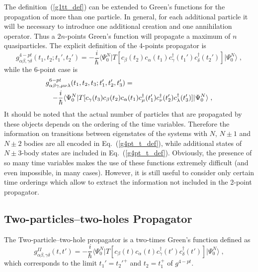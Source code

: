 The definition~(\ref{g1tt_def}) can be extended to Green's functions for the propagation of more than one particle.
In general, for each additional particle it will be necessary to introduce one additional creation and one annihilation operator. Thus a $2n$-points Green's function will propagate a maximum of $n$ quasiparticles.
The explicit definition of the 4-points propagator is
\begin{equation}
g^{4-pt}_{\alpha \beta, \gamma \delta}(t_1, t_2; t_1', t_2') = -\frac{i}{\hbar} 
\langle \Psi^N_0 \vert T [c_\beta(t_2) c_\alpha(t_1) c_\gamma^\dag(t_1')  c_\delta^\dag(t_2') ] \vert \Psi^N_0 \rangle \; ,
\label{g4pt_t_def}
\end{equation}
while the 6-point case is
\begin{eqnarray}
\lefteqn{
g^{6-pt}_{\alpha \beta \gamma, \mu \nu \lambda}(t_1, t_2, t_3; t_1', t_2', t_3') =
} & & 
\nonumber \\
\qquad  & & -\frac{i}{\hbar} 
\langle \Psi^N_0 \vert T [  c_\gamma(t_3) c_\beta(t_2) c_\alpha(t_1)
        c_\mu^\dag(t_1')  c_\nu^\dag(t_2')  c_\lambda^\dag(t_3')] \vert \Psi^N_0 \rangle \; ,
\qquad
\label{g6pt_t_def}
\end{eqnarray}
It should be noted that the actual number of particles that are propagated by these objects depends on the ordering of the time variables. Therefore the information on transitions between eigenstates of the systems with $N$, $N\pm1$ and $N\pm2$ bodies are all encoded in Eq.~(\ref{g4pt_t_def}), while additional states of $N\pm3$-body states are included in Eq.~(\ref{g4pt_t_def}).
%
Obviously, the presence of so many time variables makes the use of these functions extremely difficult (and even impossible, in many cases). However, it is still useful to consider only certain time orderings which allow to extract the information not included in the 2-point propagator.

\subsection{Two-particles--two-holes Propagator}

The Two-particle--two-hole propagator is a two-times Green's function defined as
\begin{equation}
g^{II}_{\alpha \beta, \gamma \delta}(t, t') = -\frac{i}{\hbar} 
\langle \Psi^N_0 \vert T [c_\beta(t) c_\alpha(t) c_\gamma^\dag(t')  c_\delta^\dag(t') ] \vert \Psi^N_0 \rangle \; ,
\label{gII_t_def}
\end{equation}
which corresponds to the limit $t_1'=t_2'^+$ and $t_2=t_1^+$ of $g^{4-pt}$.

